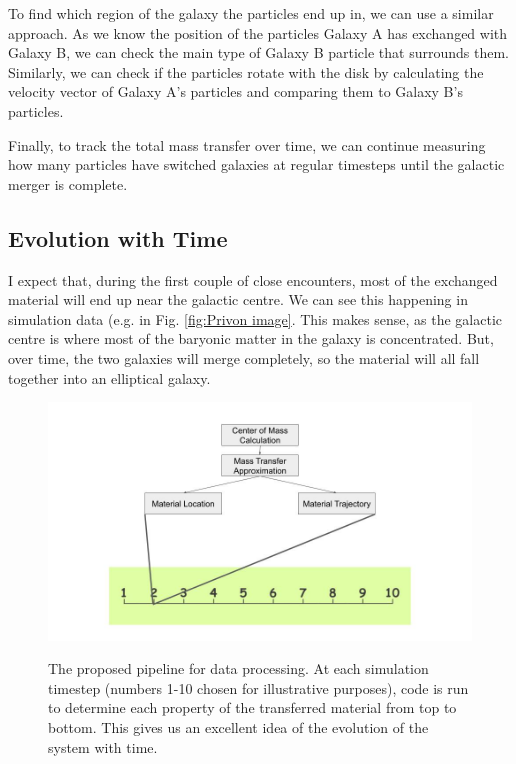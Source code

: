 \documentclass[linenumbers, ]{aastex631}
\begin{document}
To find which region of the galaxy the particles end up in, we can use a similar approach. As we know the position of the particles Galaxy A has exchanged with Galaxy B, we can check the main type of Galaxy B particle that surrounds them. Similarly, we can check if the particles rotate with the disk by calculating the velocity vector of Galaxy A's particles and comparing them to Galaxy B's particles. 

Finally, to track the total mass transfer over time, we can continue measuring how many particles have switched galaxies at regular timesteps until the galactic merger is complete.

\subsection{Evolution with Time}

I expect that, during the first couple of close encounters, most of the exchanged material will end up near the galactic centre. We can see this happening in simulation data (e.g. in Fig. \ref{fig:Privon image}. This makes sense, as the galactic centre is where most of the baryonic matter in the galaxy is concentrated. But, over time, the two galaxies will merge completely, so the material will all fall together into an elliptical galaxy.

\begin{figure}
    \centering
    \includegraphics[width = \linewidth]{Untitled presentation.jpg}
    \label{fig:Untitled image}
    \caption{The proposed pipeline for data processing. At each simulation timestep (numbers 1-10 chosen for illustrative purposes), code is run to determine each property of the transferred material from top to bottom. This gives us an excellent idea of the evolution of the system with time.}
\end{figure}
\end{document}
